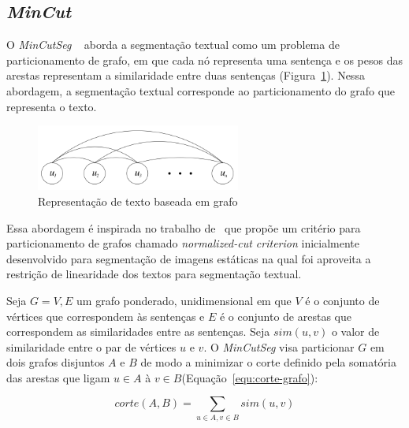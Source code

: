 

\subsection*{\textit{MinCut}}





O \textit{MinCutSeg} ~\cite{Malioutov:2006a} aborda a segmentação textual como um problema de particionamento de grafo, em que cada nó representa uma sentença e os pesos das arestas representam a similaridade entre duas sentenças (Figura~\ref{fig:representacao-texto-grafo}). Nessa abordagem, a segmentação textual corresponde ao particionamento do grafo que representa o texto.


  \begin{figure}[!h]
	  \centering
	  \includegraphics[width=0.6\textwidth]{conteudo/capitulos/figs/graph-representation-of-text.png}
	  \caption{Representação de texto baseada em grafo~\cite{Malioutov:2006a}}
	  \label{fig:representacao-texto-grafo}
  \end{figure}


Essa abordagem é inspirada no trabalho de~\cite{Shi2000} que propõe um critério para particionamento de grafos chamado \textit{normalized-cut criterion} inicialmente desenvolvido para segmentação de imagens estáticas na qual foi aproveita a restrição de linearidade dos textos para segmentação textual.

Seja $G = {V,E}$ um grafo ponderado, unidimensional em que $V$ é o conjunto de vértices que correspondem às sentenças e $E$ é o conjunto de arestas que correspondem as similaridades entre as sentenças. Seja $sim(u, v)$ o valor de similaridade entre o par de vértices $u$ e $v$. O \textit{MinCutSeg} visa particionar $G$ em dois grafos disjuntos $A$ e $B$ de modo a minimizar o corte definido pela somatória das arestas que ligam $u \in A$ à $v \in B$(Equação~\ref{equ:corte-grafo}):

\begin{equation} 
	corte(A,B) = \sum_{u \in A,v \in B} sim(u, v) 
	\label{equ:corte-grafo}
\end{equation}



